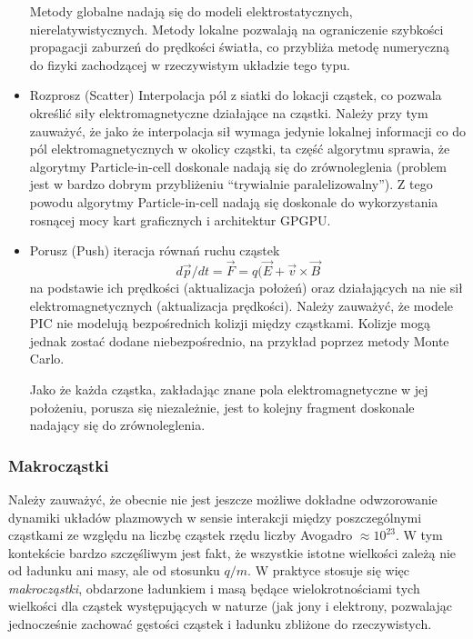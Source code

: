 \begin{itemize}
    Metody globalne nadają się do modeli elektrostatycznych,
    nierelatywistycznych.  Metody lokalne pozwalają na ograniczenie szybkości
    propagacji zaburzeń do prędkości światła, co przybliża metodę numeryczną do
    fizyki zachodzącej w rzeczywistym układzie tego typu.
    \item Rozprosz (Scatter)
    Interpolacja pól z siatki do lokacji cząstek, co pozwala określić siły
    elektromagnetyczne działające na cząstki.  Należy przy tym zauważyć, że
    jako że interpolacja sił wymaga jedynie lokalnej informacji co do pól
    elektromagnetycznych w okolicy cząstki, ta część algorytmu sprawia, że
    algorytmy Particle-in-cell doskonale nadają się do zrównoleglenia (problem
    jest w bardzo dobrym przybliżeniu ``trywialnie paralelizowalny''). Z tego
    powodu algorytmy Particle-in-cell nadają się doskonale do wykorzystania
    rosnącej mocy kart graficznych i architektur GPGPU.
    \item Porusz (Push)
    iteracja równań ruchu cząstek
    \begin{equation}
        d \vec{p}/dt = \vec{F} = q (\vec{E} + \vec{v} \times \vec{B}
        \label{eq-of-motion}
    \end{equation}
    na podstawie ich prędkości (aktualizacja położeń) oraz działających na nie
    sił elektromagnetycznych (aktualizacja prędkości). Należy zauważyć, że
    modele PIC nie modelują bezpośrednich kolizji między cząstkami. Kolizje
    mogą jednak zostać dodane niebezpośrednio, na przykład poprzez metody Monte
    Carlo. 

    Jako że każda cząstka, zakładając znane pola elektromagnetyczne w jej
    położeniu, porusza się niezależnie, jest to kolejny fragment doskonale
    nadający się do zrównoleglenia.
    \end{itemize}
    \subsubsection{Makrocząstki}
    Należy zauważyć, że obecnie nie jest jeszcze możliwe dokładne odwzorowanie
    dynamiki układów plazmowych w sensie interakcji między poszczególnymi
    cząstkami ze względu na liczbę cząstek rzędu liczby Avogadro $\approx
    10^{23}$.  W tym kontekście bardzo szczęśliwym jest fakt, że wszystkie
    istotne wielkości zależą nie od ładunku ani masy, ale od stosunku $q/m$. W
    praktyce stosuje się więc \emph{makrocząstki}, obdarzone ładunkiem i masą
    będące wielokrotnościami tych wielkości dla cząstek występujących w naturze
    (jak jony i elektrony, pozwalając jednocześnie zachować gęstości cząstek i
    ładunku zbliżone do rzeczywistych.

